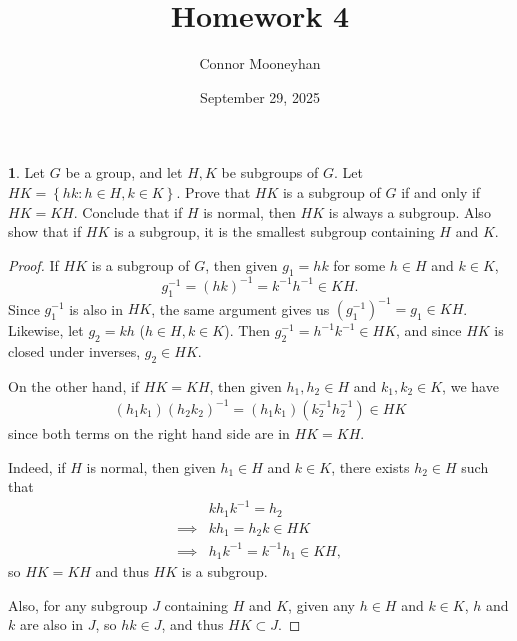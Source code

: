 \documentclass[12pt]{article}
\title{Homework 4}
\author{Connor Mooneyhan}
\date{September 29, 2025}
\theoremstyle{definition}
\newtheorem{ex}{}
\begin{document}
\maketitle

\begin{ex}
	Let $G$ be a group, and let $H, K$ be subgroups of $G$.
	Let $HK = \left\lbrace hk : h \in H, k \in K \right\rbrace$.
	Prove that $HK$ is a subgroup of $G$ if and only if $HK = KH$.
	Conclude that if $H$ is normal, then $HK$ is always a subgroup.
	Also show that if $HK$ is a subgroup, it is the smallest subgroup containing $H$ and $K$.
\end{ex}
\begin{proof}
	If $HK$ is a subgroup of $G$, then given $g_1 = hk$ for some $h \in H$ and $k \in K$, \begin{equation*}
		g_1^{-1} = (hk)^{-1} = k^{-1}h^{-1} \in KH.
	\end{equation*}
	Since $g_1^{-1}$ is also in $HK$, the same argument gives us $(g_1^{-1})^{-1} = g_1 \in KH$.
	Likewise, let $g_2 = kh$ ($h \in H, k \in K$).
	Then $g_2^{-1} = h^{-1}k^{-1} \in HK$, and since $HK$ is closed under inverses, $g_2 \in HK$.

	On the other hand, if $HK = KH$, then given $h_1,h_2 \in H$ and $k_1,k_2 \in K$, we have \begin{align*}
		(h_1k_1)(h_2k_2)^{-1} = (h_1k_1)(k_2^{-1}h_2^{-1}) \in HK
	\end{align*}
	since both terms on the right hand side are in $HK = KH$.

	Indeed, if $H$ is normal, then given $h_1 \in H$ and $k \in K$, there exists $h_2 \in H$ such that \begin{align*}
		         & kh_1k^{-1} = h_2              \\
		\implies & kh_1 = h_2k \in HK            \\
		\implies & h_1k^{-1} = k^{-1}h_1 \in KH,
	\end{align*}
	so $HK = KH$ and thus $HK$ is a subgroup.

	Also, for any subgroup $J$ containing $H$ and $K$, given any $h \in H$ and $k \in K$, $h$ and $k$ are also in $J$, so $hk \in J$, and thus $HK \subset J$.
\end{proof}
\end{document}
